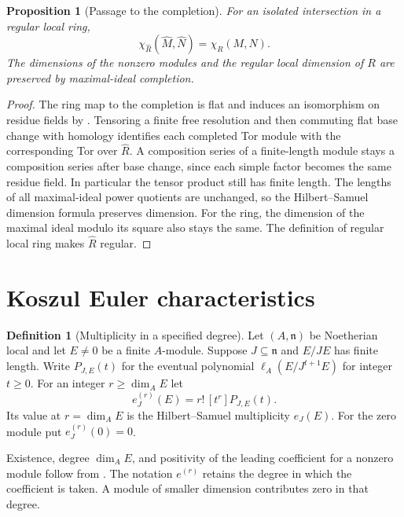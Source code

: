 \documentclass[11pt,oneside,openany]{book}
\newtheorem{proposition}[theorem]{Proposition}
\theoremstyle{definition}
\newtheorem{definition}[theorem]{Definition}
\theoremstyle{remark}
\begin{document}
\begin{proposition}[Passage to the completion]\label{res:I03}
For an isolated intersection in a regular local ring,
\[
 \chi_{\widehat R}(\widehat M,\widehat N)=\chi_R(M,N).
\]
The dimensions of the nonzero modules and the regular local dimension
of \(R\) are preserved by maximal-ideal completion.
\end{proposition}
\begin{proof}
The ring map to the completion is flat and induces an isomorphism on
residue fields by \cite[ALG-05-C04-S01]{p103}. Tensoring a finite free
resolution and then commuting flat base change with homology identifies
each completed Tor module with the corresponding Tor over
\(\widehat R\). A composition series of a finite-length module stays a
composition series after base change, since each simple factor becomes
the same residue field. In particular the tensor product still has
finite length. The lengths of all maximal-ideal power quotients are
unchanged, so the Hilbert--Samuel dimension formula
\cite[ALG-05-C03-S02]{p103} preserves dimension. For the ring, the
dimension of the maximal ideal modulo its square also stays the same.
The definition of regular local ring makes \(\widehat R\) regular.
\end{proof}

\section{Koszul Euler characteristics}

\begin{definition}[Multiplicity in a specified degree]\label{res:I04}
Let \((A,\mathfrak n)\) be Noetherian local and let \(E\ne 0\) be a
finite \(A\)-module. Suppose \(J\subseteq\mathfrak n\) and \(E/JE\)
has finite length. Write \(P_{J,E}(t)\) for the eventual polynomial
\(\ell_A(E/J^{t+1}E)\) for integer \(t\ge 0\). For an integer
\(r\ge\dim_A E\) let
\[
 e^{(r)}_J(E)=r!\,[t^r]P_{J,E}(t).
\]
Its value at \(r=\dim_A E\) is the Hilbert--Samuel multiplicity
\(e_J(E)\). For the zero module put \(e^{(r)}_J(0)=0\).
\end{definition}

Existence, degree \(\dim_A E\), and positivity of the leading
coefficient for a nonzero module follow from
\cite[ALG-05-C03-S02]{p103}. The notation \(e^{(r)}\) retains the
degree in which the coefficient is taken. A module of smaller
dimension contributes zero in that degree.
\end{document}
